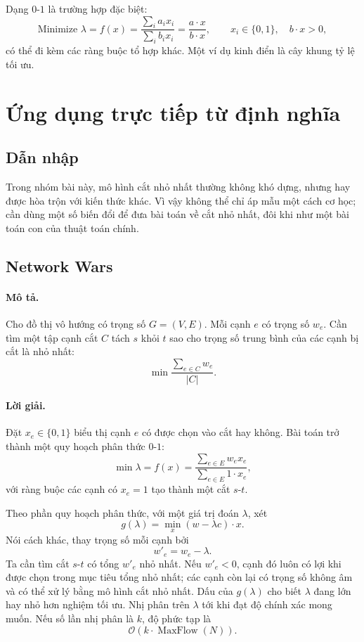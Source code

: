 \documentclass[11pt]{article}
\newcommand{\Oh}{\mathcal{O}}
\begin{document}
Dạng \(0\)-\(1\) là trường hợp đặc biệt:
\[
  \text{Minimize }\lambda=f(x)=\frac{\sum_i a_i x_i}{\sum_i b_i x_i}
  =\frac{a\cdot x}{b\cdot x},\qquad x_i\in\{0,1\},\quad b\cdot x>0,
\]
có thể đi kèm các ràng buộc tổ hợp khác. Một ví dụ kinh điển là cây khung tỷ
lệ tối ưu.

\section{Ứng dụng trực tiếp từ định nghĩa}

\subsection{Dẫn nhập}

Trong nhóm bài này, mô hình cắt nhỏ nhất thường không khó dựng, nhưng hay
được hòa trộn với kiến thức khác. Vì vậy không thể chỉ áp mẫu một cách cơ học;
cần dùng một số biến đổi để đưa bài toán về cắt nhỏ nhất, đôi khi như một bài
toán con của thuật toán chính.

\subsection{Network Wars}

\paragraph{Mô tả.}
Cho đồ thị vô hướng có trọng số \(G=(V,E)\). Mỗi cạnh \(e\) có trọng số
\(w_e\). Cần tìm một tập cạnh cắt \(C\) tách \(s\) khỏi \(t\) sao cho trọng số
trung bình của các cạnh bị cắt là nhỏ nhất:
\[
  \min \frac{\sum_{e\in C} w_e}{|C|}. \tag{2.1}
\]

\paragraph{Lời giải.}
Đặt \(x_e\in\{0,1\}\) biểu thị cạnh \(e\) có được chọn vào cắt hay không. Bài
toán trở thành một quy hoạch phân thức \(0\)-\(1\):
\[
  \min \lambda=f(x)=
  \frac{\sum_{e\in E} w_e x_e}{\sum_{e\in E} 1\cdot x_e},
\]
với ràng buộc các cạnh có \(x_e=1\) tạo thành một cắt \(s\)-\(t\).

Theo phần quy hoạch phân thức, với một giá trị đoán \(\lambda\), xét
\[
  g(\lambda)=\min_x (w-\lambda c)\cdot x.
\]
Nói cách khác, thay trọng số mỗi cạnh bởi
\[
  w'_e=w_e-\lambda.
\]
Ta cần tìm cắt \(s\)-\(t\) có tổng \(w'_e\) nhỏ nhất. Nếu \(w'_e<0\), cạnh đó
luôn có lợi khi được chọn trong mục tiêu tổng nhỏ nhất; các cạnh còn lại có
trọng số không âm và có thể xử lý bằng mô hình cắt nhỏ nhất. Dấu của
\(g(\lambda)\) cho biết \(\lambda\) đang lớn hay nhỏ hơn nghiệm tối ưu. Nhị
phân trên \(\lambda\) tới khi đạt độ chính xác mong muốn. Nếu số lần nhị phân
là \(k\), độ phức tạp là
\[
  \Oh(k\cdot \operatorname{MaxFlow}(N)).
\]
\end{document}
